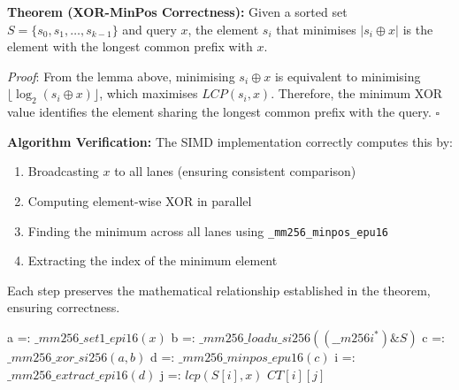 \textbf{Theorem (XOR-MinPos Correctness):} Given a sorted set $S = \{s_0, s_1, \ldots, s_{k-1}\}$ and query $x$, the element $s_i$ that minimises $|s_i \oplus x|$ is the element with the longest common prefix with $x$.

\textit{Proof}: From the lemma above, minimising $s_i \oplus x$ is equivalent to minimising $\lfloor \log_2(s_i \oplus x) \rfloor$, which maximises $LCP(s_i, x)$. Therefore, the minimum XOR value identifies the element sharing the longest common prefix with the query. $\square$

\textbf{Algorithm Verification:} The SIMD implementation correctly computes this by:
\begin{enumerate}
    \item Broadcasting $x$ to all lanes (ensuring consistent comparison)
    \item Computing element-wise XOR in parallel
    \item Finding the minimum across all lanes using \texttt{\_mm256\_minpos\_epu16}
    \item Extracting the index of the minimum element
\end{enumerate}

Each step preserves the mathematical relationship established in the theorem, ensuring correctness.
\begin{table}[H]
    \centering
    \begin{minipage}[t]{1\textwidth}
        \centering
        \begin{algorithm}[H]
            \caption{rankFWImproved(S, x)}
            \begin{algorithmic}[1]
                \STATE a =: $\_mm256\_set1\_epi16(x)$
                \STATE b =: $\_mm256\_loadu\_si256((\_\_m256i^*)\&S)$
                \STATE c =: $\_mm256\_xor\_si256(a, b)$
                \STATE d =: $\_mm256\_minpos\_epu16(c)$
                \STATE i =: $\_mm256\_extract\_epi16(d)$
                \STATE j =: $lcp(S[i], x)$
                \RETURN $CT[i][j]$
            \end{algorithmic}
        \end{algorithm}
    \end{minipage}%
\end{table}
